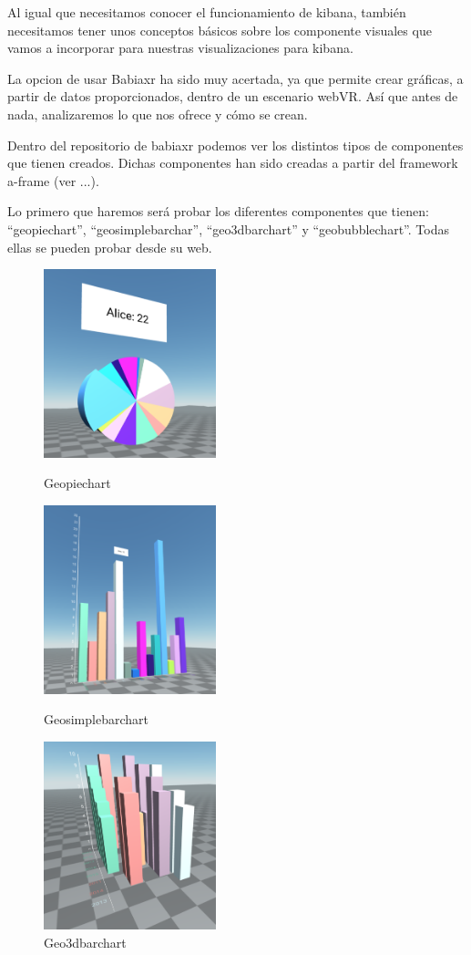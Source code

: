 \documentclass[a4paper, 12pt]{book}
\begin{document}
Al igual que necesitamos conocer el funcionamiento de kibana, también necesitamos tener unos conceptos básicos sobre los componente visuales que vamos a incorporar para nuestras visualizaciones para kibana.

La opcion de usar Babiaxr ha sido muy acertada, ya que permite crear gráficas, a partir de datos proporcionados, dentro de un escenario webVR. Así que antes de nada, analizaremos lo que nos ofrece y cómo se crean.

Dentro del repositorio de babiaxr podemos ver los distintos tipos de componentes que tienen creados. Dichas componentes han sido creadas a partir del framework a-frame (ver ...).

Lo primero que haremos será probar los diferentes componentes que tienen: “geopiechart”, “geosimplebarchar”, “geo3dbarchart” y “geobubblechart”. Todas ellas se pueden probar desde su web.

\begin{figure}[H]
  \centering
  \includegraphics[width=5cm, keepaspectratio]{img/development/babiaxr-pie.png}
  \caption{Geopiechart}
  \label{fig:babiaxrgeopiechart}
  \endminipage\hfill
  \includegraphics[width=5cm, keepaspectratio]{img/development/babiaxr-simplebar.png}
  \caption{Geosimplebarchart}
  \label{fig:babiaxrgeosimplebarchart}
  \endminipage\hfill
  \includegraphics[width=5cm, keepaspectratio]{img/development/babiaxr-3dbar.png}
  \caption{Geo3dbarchart}
  \label{fig:babiaxrgeo3dbarchart}
  \endminipage\hfill
\end{figure}
\end{document}
